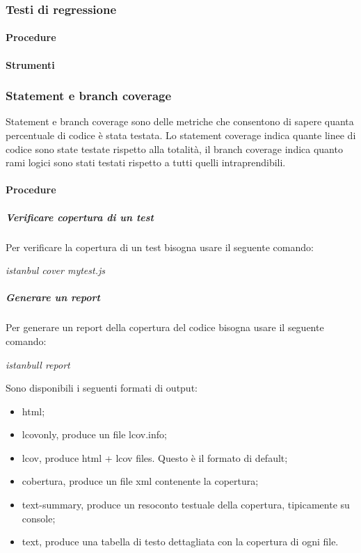 \subsubsection{Testi di regressione}

\paragraph{Procedure}

\paragraph{Strumenti}

\subsubsection{Statement e branch coverage}
Statement e branch coverage sono delle metriche che consentono di sapere quanta percentuale di codice è stata testata.
Lo statement coverage indica quante linee di codice sono state testate rispetto alla totalità, il branch coverage indica quanto rami logici sono stati testati rispetto a tutti quelli intraprendibili.

\paragraph{Procedure}
\subparagraph{Verificare copertura di un test}
Per verificare la copertura di un test bisogna usare il seguente comando:\\
\begin{center}
\textit{istanbul cover mytest.js}\\
\end{center}

\subparagraph{Generare un report}
Per generare un report della copertura del codice bisogna usare il seguente comando:\\

\begin{center}
\textit{istanbull report}\\
\end{center}
Sono disponibili i seguenti formati di output:
\begin{itemize}
\item html;
\item lcovonly, produce un file lcov.info;
\item lcov, produce html + lcov files. Questo è il formato di default;
\item cobertura, produce un file xml contenente la copertura;
\item text-summary, produce un resoconto testuale della copertura, tipicamente su console;
\item text, produce una tabella di testo dettagliata con la copertura di ogni file.
\end{itemize}

